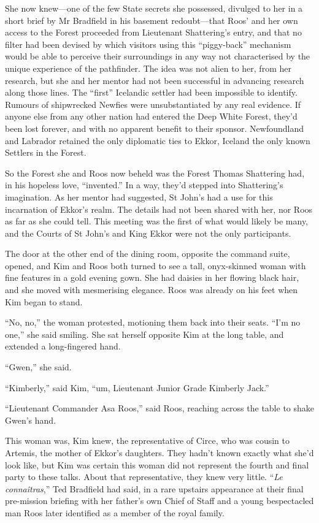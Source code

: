\documentclass[11pt,a5paper]{article}
\begin{document}
She now knew---one of the few State secrets she possessed, divulged to her in a short brief by Mr Bradfield in his basement redoubt---that Roos' and her own access to the Forest proceeded from Lieutenant Shattering's entry, and that no filter had been devised by which visitors using this ``piggy-back'' mechanism would be able to perceive their surroundings in any way not characterised by the unique experience of the pathfinder. The idea was not alien to her, from her research, but she and her mentor had not been successful in advancing research along those lines. The ``first'' Icelandic settler had been impossible to identify. Rumours of shipwrecked Newfies were unsubstantiated by any real evidence. If anyone else from any other nation had entered the Deep White Forest, they'd been lost forever, and with no apparent benefit to their sponsor. Newfoundland and Labrador retained the only diplomatic ties to Ekkor, Iceland the only known Settlers in the Forest.

So the Forest she and Roos now beheld was the Forest Thomas Shattering had, in his hopeless love, ``invented.'' In a way, they'd stepped into Shattering's imagination. As her mentor had suggested, St John's had a use for this incarnation of Ekkor's realm. The details had not been shared with her, nor Roos as far as she could tell. This meeting was the first of what would likely be many, and the Courts of St John's and King Ekkor were not the only participants.

The door at the other end of the dining room, opposite the command suite, opened, and Kim and Roos both turned to see a tall, onyx-skinned woman with fine features in a gold evening gown. She had daisies in her flowing black hair, and she moved with mesmerising elegance. Roos was already on his feet when Kim began to stand.

``No, no,'' the woman protested, motioning them back into their seats. ``I'm no one,'' she said smiling. She sat herself opposite Kim at the long table, and extended a long-fingered hand.

``Gwen,'' she said.

``Kimberly,'' said Kim, ``um, Lieutenant Junior Grade Kimberly Jack.''

``Lieutenant Commander Asa Roos,'' said Roos, reaching across the table to shake Gwen's hand.

This woman was, Kim knew, the representative of Circe, who was cousin to Artemis, the mother of Ekkor's daughters. They hadn't known exactly what she'd look like, but Kim was certain this woman did not represent the fourth and final party to these talks. About that representative, they knew very little. ``\emph{Le connaîtras},'' Ted Bradfield had said, in a rare upstairs appearance at their final pre-mission briefing with her father's own Chief of Staff and a young bespectacled man Roos later identified as a member of the royal family.
\end{document}
